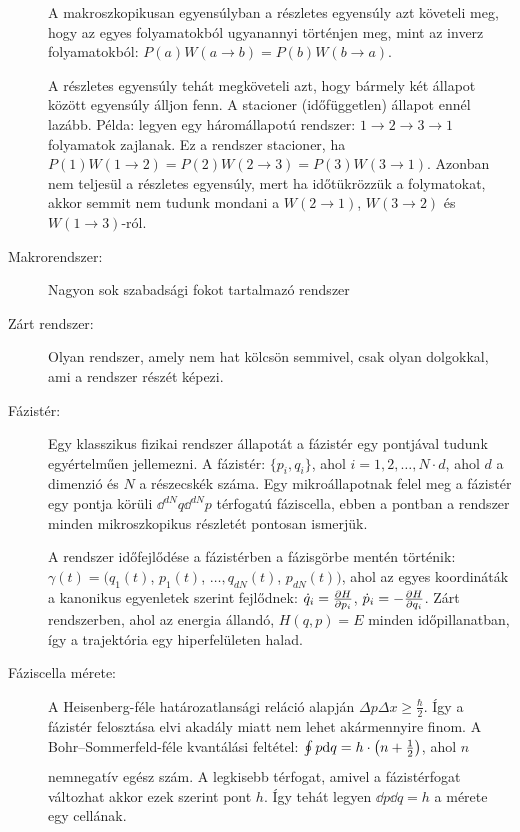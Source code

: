 \begin{description}
    A makroszkopikusan egyensúlyban a részletes egyensúly azt követeli meg, hogy az egyes folyamatokból ugyanannyi történjen meg, mint az inverz folyamatokból: $P(a)W(a\to b)=P(b)W(b\to a)$.
    
    A részletes egyensúly tehát megköveteli azt, hogy bármely két állapot között egyensúly álljon fenn. A stacioner (időfüggetlen) állapot ennél lazább. Példa: legyen egy háromállapotú rendszer: $1\to 2\to 3\to 1$ folyamatok zajlanak. Ez a rendszer stacioner, ha $P(1)W(1\to 2)=P(2)W(2\to 3)=P(3)W(3\to 1)$. Azonban nem teljesül a részletes egyensúly, mert ha időtükrözzük a folymatokat, akkor semmit nem tudunk mondani a $W(2\to 1)$, $W(3\to 2)$ és $W(1\to 3)$-ról.
    
   \item[Makrorendszer:]
    
    Nagyon sok szabadsági fokot tartalmazó rendszer
   
   \item[Zárt rendszer:]
    
    Olyan rendszer, amely nem hat kölcsön semmivel, csak olyan dolgokkal, ami a rendszer részét képezi.
    
   \item[Fázistér:]
    
    Egy klasszikus fizikai rendszer állapotát a fázistér egy pontjával tudunk egyértelműen jellemezni. A fázistér: $\{p_i,q_i\}$, ahol $i=1,2,\dots,N\cdot d$, ahol $d$ a dimenzió és $N$ a részecskék száma. Egy mikroállapotnak felel meg a fázistér egy pontja körüli $\dd^{dN}q\dd^{dN}p$ térfogatú fáziscella, ebben a pontban a rendszer minden mikroszkopikus részletét pontosan ismerjük.
    
    A rendszer időfejlődése a fázistérben a fázisgörbe mentén történik: $\gamma(t)=(q_1(t)$, $p_1(t)$, $\dots,q_{dN}(t)$, $p_{dN}(t))$, ahol az egyes koordináták a kanonikus egyenletek szerint fejlődnek: $\dot{q}_i=\frac{\partial H}{\partial p_i}$, $\dot{p}_i=-\frac{\partial H}{\partial q_i}$. Zárt rendszerben, ahol az energia állandó, $H(q,p)=E$ minden időpillanatban, így a trajektória egy hiperfelületen halad.
    
   \item[Fáziscella mérete:]
    
    A Heisenberg-féle határozatlansági reláció alapján $\Delta p\Delta x\ge\frac{\hbar}{2}$. Így a fázistér felosztása elvi akadály miatt nem lehet akármennyire finom. A Bohr--Sommerfeld-féle kvantálási feltétel: $\oint\limits_{}^{}p\mathrm{d} q=h\cdot\left(n+\frac{1}{2}\right)$, ahol $n$ nemnegatív egész szám. A legkisebb térfogat, amivel a fázistérfogat változhat akkor ezek szerint pont $h$. Így tehát legyen $\dd p\dd q=h$ a mérete egy cellának. 
   

\end{description}
